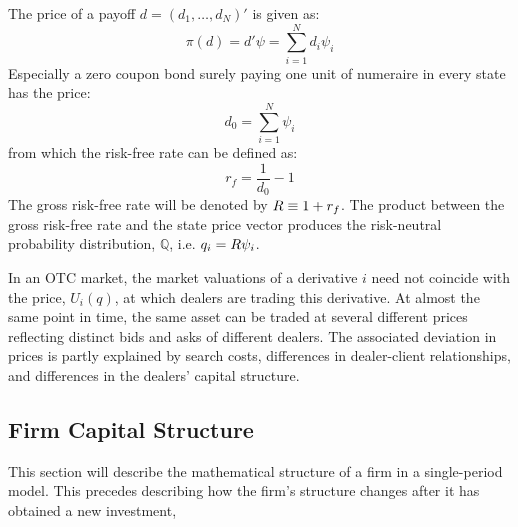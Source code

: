 \documentclass[main.tex]{subfiles}
\begin{document}
        The price of a payoff $d=\left(d_{1}, \dots, d_{N}\right)'$ is given as:
            \begin{equation}
                \pi(d) = d'\psi = \sum_{i=1}^{N} d_{i}\psi_{i}
            \end{equation}
        Especially a zero coupon bond surely paying one unit of numeraire in every state has the price:
            \begin{equation}
                d_{0} = \sum_{i=1}^{N} \psi_{i}
            \end{equation}
        from which the risk-free rate can be defined as:
            \begin{equation}
                r_{f} = \frac{1}{d_{0}} - 1
            \end{equation}
        The gross risk-free rate will be denoted by $R \equiv 1 + r_{f}$.
        The product between the gross risk-free rate and the state price vector produces the risk-neutral probability distribution, $\mathbb{Q}$, i.e. $q_{i} = R\psi_{i}$.

        In an OTC market, the market valuations of a derivative $i$ need not coincide with the price, $U_{i}(q)$, at which dealers are trading this derivative.
        At almost the same point in time, the same asset can be traded at several different prices reflecting distinct bids and asks of different dealers.
        The associated deviation in prices is partly explained by search costs, differences in dealer-client relationships, and differences in the dealers' capital structure.

    \subsection{Firm Capital Structure}
        This section will describe the mathematical structure of a firm in a single-period model.
        This precedes describing how the firm's structure changes after it has obtained a new investment,
        
\end{document}
